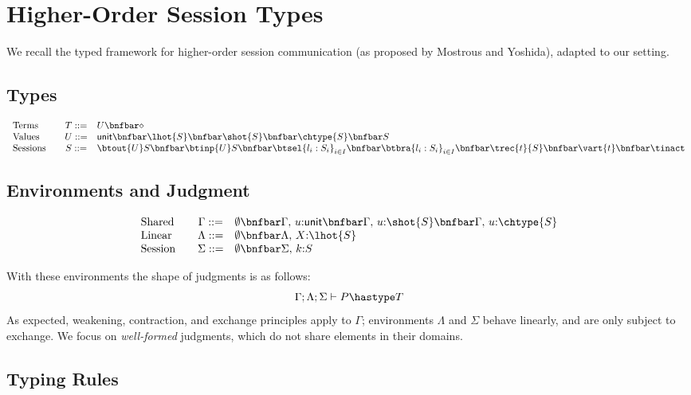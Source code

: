 
\newcommand{\Proc}{\ensuremath{\diamond}}
\newcommand{\Unit}{\ensuremath{\mathsf{unit}}}
\newcommand{\UnitV}{\ensuremath{()}}

\section{Higher-Order Session Types}

We recall the typed framework for higher-order session communication (as proposed by Mostrous and Yoshida), adapted to our setting.

\subsection{Types}

\[
\begin{array}{lcl}
\text{Terms} & T ::= & U  \bnfbar  \Proc\\
\text{Values} & U ::= & \Unit  \bnfbar  \lhot{S} \bnfbar \shot{S} \bnfbar \chtype{S} \bnfbar S \\
\text{Sessions} \quad & S ::= &  \btout{U} S \bnfbar \btinp{U} S
		\bnfbar		\btsel{l_i:S_i}_{i \in I} \bnfbar \btbra{l_i:S_i}_{i \in I} \bnfbar \trec{t}{S} \bnfbar \vart{t}  \bnfbar \tinact 
\end{array}
\]

\subsection{Environments and Judgment}
\[
\begin{array}{lcl}
\text{Shared} & \Gamma :: = & \emptyset \bnfbar \Gamma, \, u{:}\Unit \bnfbar \Gamma,\, u{:}\shot{S} \bnfbar \Gamma, \,u{:}\chtype{S} \\
\text{Linear} & \Lambda :: = & \emptyset \bnfbar \Lambda,\, X{:}\lhot{S}  \\
\text{Session} \quad & \Sigma :: = & \emptyset \bnfbar \Sigma,\, k{:}S  
\end{array}
\]


With these environments the shape of judgments is as follows:
\[
\Gamma; \Lambda ; \Sigma \vdash P \hastype T
\]
As expected, weakening, contraction, and exchange principles apply to $\Gamma$; environments $\Lambda$ and $\Sigma$ behave linearly, and are only subject to exchange.
We focus on \emph{well-formed} judgments, which do not share elements in their domains.


\subsection{Typing Rules}

